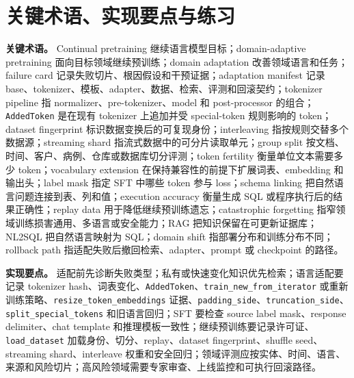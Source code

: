 \documentclass[UTF8,zihao=-4,openany]{ctexbook}
\begin{document}
\section{关键术语、实现要点与练习}
\textbf{关键术语。} Continual pretraining 继续语言模型目标；domain-adaptive pretraining 面向目标领域继续预训练；domain adaptation 改善领域语言和任务；failure card 记录失败切片、根因假设和干预证据；adaptation manifest 记录 base、tokenizer、模板、adapter、数据、检索、评测和回滚契约；tokenizer pipeline 指 normalizer、pre-tokenizer、model 和 post-processor 的组合；\texttt{AddedToken} 是在现有 tokenizer 上追加并受 special-token 规则影响的 token；dataset fingerprint 标识数据变换后的可复现身份；interleaving 指按规则交替多个数据源；streaming shard 指流式数据中的可分片读取单元；group split 按文档、时间、客户、病例、仓库或数据库切分评测；token fertility 衡量单位文本需要多少 token；vocabulary extension 在保持兼容性的前提下扩展词表、embedding 和输出头；label mask 指定 SFT 中哪些 token 参与 loss；schema linking 把自然语言问题连接到表、列和值；execution accuracy 衡量生成 SQL 或程序执行后的结果正确性；replay data 用于降低继续预训练遗忘；catastrophic forgetting 指窄领域训练损害通用、多语言或安全能力；RAG 把知识保留在可更新证据库；NL2SQL 把自然语言映射为 SQL；domain shift 指部署分布和训练分布不同；rollback path 指适配失败后撤回检索、adapter、prompt 或 checkpoint 的路径。

\textbf{实现要点。} 适配前先诊断失败类型；私有或快速变化知识优先检索；语言适配要记录 tokenizer hash、词表变化、\texttt{AddedToken}、\texttt{train\_new\_from\_iterator} 或重新训练策略、\texttt{resize\_token\_embeddings} 证据、\texttt{padding\_side}、\texttt{truncation\_side}、\texttt{split\_special\_tokens} 和旧语言回归；SFT 要检查 source label mask、response delimiter、chat template 和推理模板一致性；继续预训练要记录许可证、\texttt{load\_dataset} 加载身份、切分、replay、dataset fingerprint、shuffle seed、streaming shard、interleave 权重和安全回归；领域评测应按实体、时间、语言、来源和风险切片；高风险领域需要专家审查、上线监控和可执行回滚路径。
\end{document}

